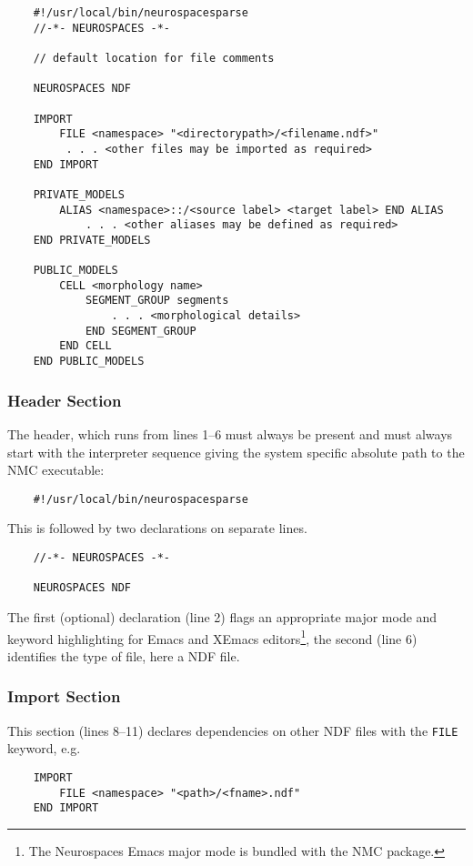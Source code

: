 \documentclass[12pt]{article}
\begin{document}
\begin{center}
 \begin{linenumbers}
\begin{verbatim}
    #!/usr/local/bin/neurospacesparse
    //-*- NEUROSPACES -*-

    // default location for file comments

    NEUROSPACES NDF

    IMPORT
        FILE <namespace> "<directorypath>/<filename.ndf>"
         . . . <other files may be imported as required>
    END IMPORT

    PRIVATE_MODELS
        ALIAS <namespace>::/<source label> <target label> END ALIAS
            . . . <other aliases may be defined as required>
    END PRIVATE_MODELS

    PUBLIC_MODELS
        CELL <morphology name>
            SEGMENT_GROUP segments
                . . . <morphological details>
            END SEGMENT_GROUP
        END CELL
    END PUBLIC_MODELS
\end{verbatim}
\end{linenumbers}
\end{center}

\subsubsection*{Header Section}
The header, which runs from lines 1--6 must always be present and must always start with the
interpreter sequence giving the system specific absolute path to the
NMC executable:
\begin{verbatim}
    #!/usr/local/bin/neurospacesparse
\end{verbatim}
This is followed by two declarations on separate lines. 
\begin{verbatim}
    //-*- NEUROSPACES -*-
    
    NEUROSPACES NDF
    \end{verbatim}
The first (optional) declaration (line 2) flags an appropriate major mode and keyword highlighting for Emacs and
XEmacs editors\footnote{The Neurospaces Emacs major mode is bundled
  with the NMC package.}, the second (line 6) identifies the type
of file, here a NDF file.

\subsubsection*{Import Section}
This section (lines 8--11) declares dependencies on other NDF files with the {\tt  FILE} keyword, e.g.
\begin{verbatim}
    IMPORT
        FILE <namespace> "<path>/<fname>.ndf"
    END IMPORT
\end{verbatim}
\end{document}
